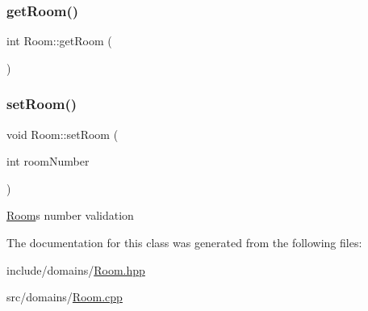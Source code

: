 \subsubsection{\texorpdfstring{getRoom()}{getRoom()}}
{\footnotesize\ttfamily int Room\+::get\+Room (\begin{DoxyParamCaption}{ }\end{DoxyParamCaption})}

\mbox{\label{class_room_ae1645c6cc522f4b1c0ba980736cb440d}} 
\subsubsection{\texorpdfstring{setRoom()}{setRoom()}}
{\footnotesize\ttfamily void Room\+::set\+Room (\begin{DoxyParamCaption}\item[{int}]{room\+Number }\end{DoxyParamCaption})}

\mbox{\hyperlink{class_room}{Room}}\textquotesingle{}s number validation 

The documentation for this class was generated from the following files\+:\begin{DoxyCompactItemize}
\item 
include/domains/\mbox{\hyperlink{_room_8hpp}{Room.\+hpp}}\item 
src/domains/\mbox{\hyperlink{_room_8cpp}{Room.\+cpp}}\end{DoxyCompactItemize}
